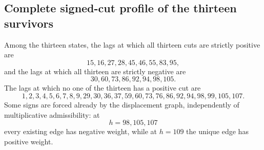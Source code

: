 \documentclass[11pt]{article}
\begin{document}
\subsection{Complete signed-cut profile of the thirteen survivors}

Among the thirteen states, the lags at which all thirteen cuts are strictly positive are
\[
 \boxed{15,16,27,28,45,46,55,83,95,}
\]
and the lags at which all thirteen are strictly negative are
\[
 \boxed{30,60,73,86,92,94,98,105.}
\]
The lags at which no one of the thirteen has a positive cut are
\[
 \boxed{
 1,2,3,4,5,6,7,8,9,29,30,36,37,59,60,73,76,86,92,94,98,99,105,107.
 }
\]
Some signs are forced already by the displacement graph, independently of multiplicative admissibility: at
\[
 h=98,105,107
\]
every existing edge has negative weight, while at $h=109$ the unique edge has positive weight.
\end{document}
